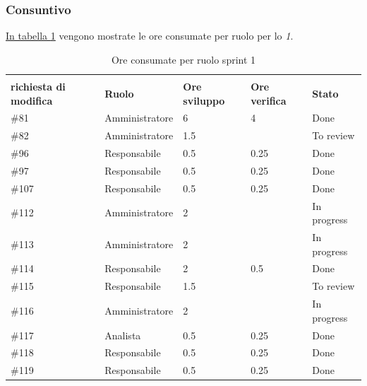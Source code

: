\subsubsection{Consuntivo}

\hyperref[tab:sprint1_ore_consumate]{In tabella \ref{tab:sprint1_ore_consumate}} vengono mostrate le ore consumate per ruolo per lo \textit{ 1}.

\begin{table}[H]
    \centering
        \begin{tabular}{| l | l | l | l | l |}
            \hline
            \makecell{\textbf{Identificativo} \\ \textbf{richiesta di modifica}} &
                \textbf{Ruolo} & 
                \textbf{Ore sviluppo} &
                \textbf{Ore verifica} & 
                \textbf{Stato}\\ 
    \hline
        \#81 & Amministratore & 6 & 4 & Done\\
    \hline
        \#82 & Amministratore& 1.5 &  & To review\\
    \hline
        \#96 & Responsabile & 0.5 & 0.25 & Done\\
    \hline
        \#97 & Responsabile & 0.5 & 0.25 & Done\\
    \hline
        \#107 & Responsabile & 0.5 & 0.25 & Done\\
    \hline
        \#112 & Amministratore & 2 & & In progress\\
    \hline
        \#113 & Amministratore & 2 & & In progress\\
    \hline
        \#114 & Responsabile & 2 & 0.5 & Done\\
    \hline
        \#115 & Responsabile & 1.5 & & To review\\
    \hline
        \#116 & Amministratore & 2 & & In progress\\
    \hline
        \#117 & Analista & 0.5 & 0.25 & Done\\
    \hline
        \#118 & Responsabile & 0.5 & 0.25 & Done\\
    \hline
        \#119 & Responsabile & 0.5 & 0.25 & Done\\
    \hline
    \end{tabular}
    \caption{Ore consumate per ruolo sprint 1}
    \label{tab:sprint1_ore_consumate} 
\end{table}